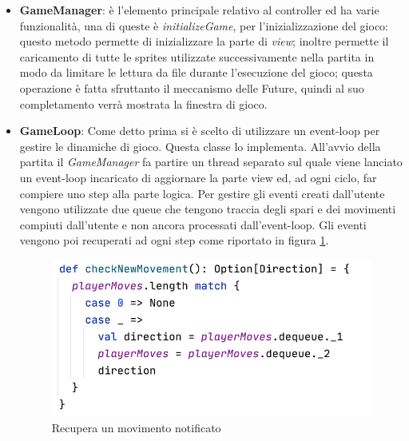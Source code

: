  \begin{itemize}
     \item  \textbf{GameManager}: è l'elemento principale relativo al controller ed ha varie funzionalità, una di queste è \textit{initializeGame}, per l'inizializzazione del gioco: questo metodo permette di inizializzare la parte di \textit{view}; inoltre permette il caricamento di tutte le sprites utilizzate successivamente nella partita in modo da limitare le lettura da file durante l'esecuzione del gioco; questa operazione è fatta sfruttanto il meccanismo delle Future, quindi al suo completamento verrà mostrata la finestra di gioco.
     
     \item \textbf{GameLoop}: Come detto prima si è scelto di utilizzare un event-loop per gestire le dinamiche di gioco. Questa classe lo implementa. All'avvio della partita il \textit{GameManager} fa partire un thread separato sul quale viene lanciato un event-loop incaricato di aggiornare la parte view ed, ad ogni ciclo, far compiere uno step alla parte logica.
    Per gestire gli eventi creati dall'utente vengono utilizzate due queue che tengono traccia degli spari e dei movimenti compiuti dall'utente e non ancora processati dall'event-loop. Gli eventi vengono poi recuperati ad ogni step come riportato in figura \ref{checknewMovement}.
    
    \begin{figure}[H]
      \includegraphics[width=13cm]{report/res/checkNewMovement.png}
      \caption{Recupera un movimento notificato}
      \label{checknewMovement}
    \end{figure}


\end{itemize}
